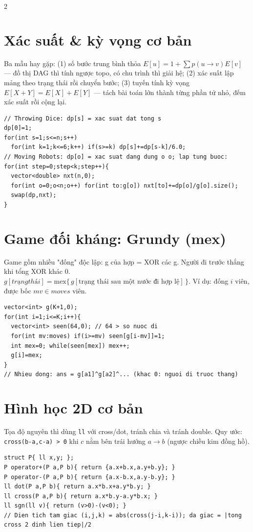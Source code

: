 \documentclass[8pt]{extarticle}
\begin{document}
\begin{multicols}{2}
\section{Xác suất \& kỳ vọng cơ bản}
Ba mẫu hay gặp: (1) số bước trung bình thỏa $E[u]=1+\sum p(u\to v)E[v]$ --- đồ thị DAG thì tính ngược topo, có chu trình thì giải hệ; (2) xác suất lập mảng theo trạng thái rồi chuyển bước; (3) tuyến tính kỳ vọng $E[X+Y]=E[X]+E[Y]$ --- tách bài toán lớn thành từng phần tử nhỏ, đếm xác suất rồi cộng lại.
\begin{lstlisting}
// Throwing Dice: dp[s] = xac suat dat tong s
dp[0]=1;
for(int s=1;s<=n;s++)
  for(int k=1;k<=6;k++) if(s>=k) dp[s]+=dp[s-k]/6.0;
// Moving Robots: dp[o] = xac suat dang dung o o; lap tung buoc:
for(int step=0;step<k;step++){
  vector<double> nxt(n,0);
  for(int o=0;o<n;o++) for(int to:g[o]) nxt[to]+=dp[o]/g[o].size();
  swap(dp,nxt);
}
\end{lstlisting}

\section{Game đối kháng: Grundy (mex)}
Game gồm nhiều "đống" độc lập: g của hợp = XOR các g. Người đi trước thắng khi tổng XOR khác 0. $g[trạng thái]=\text{mex}\{\,g[\text{trạng thái sau một nước đi hợp lệ}]\,\}$. Ví dụ: đống $i$ viên, được bốc $mv\in moves$ viên.
\begin{lstlisting}
vector<int> g(K+1,0);
for(int i=1;i<=K;i++){
  vector<int> seen(64,0); // 64 > so nuoc di
  for(int mv:moves) if(i>=mv) seen[g[i-mv]]=1;
  int mex=0; while(seen[mex]) mex++;
  g[i]=mex;
}
// Nhieu dong: ans = g[a1]^g[a2]^... (khac 0: nguoi di truoc thang)
\end{lstlisting}

\section{Hình học 2D cơ bản}
Tọa độ nguyên thì dùng \texttt{ll} với cross/dot, tránh chia và tránh double. Quy ước: \texttt{cross(b-a,c-a) > 0} khi $c$ nằm bên trái hướng $a\to b$ (ngược chiều kim đồng hồ).
\begin{lstlisting}
struct P{ ll x,y; };
P operator+(P a,P b){ return {a.x+b.x,a.y+b.y}; }
P operator-(P a,P b){ return {a.x-b.x,a.y-b.y}; }
ll dot(P a,P b){ return a.x*b.x+a.y*b.y; }
ll cross(P a,P b){ return a.x*b.y-a.y*b.x; }
ll sgn(ll v){ return (v>0)-(v<0); }
// Dien tich tam giac (i,j,k) = abs(cross(j-i,k-i)); da giac = |tong cross 2 dinh lien tiep|/2
\end{lstlisting}


\end{multicols}
\end{document}
